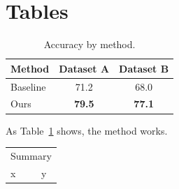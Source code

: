 
\section{Tables}
\begin{table}[ht]
  \centering
  \caption{Accuracy by method.}
  \label{tab:acc}
  \begin{tabular}{lcc}
    \hline
    Method & Dataset A & Dataset B \\
    \hline
    Baseline & 71.2 & 68.0 \\
    Ours & \textbf{79.5} & \textbf{77.1} \\
    \hline
  \end{tabular}
\end{table}

As Table~\ref{tab:acc} shows, the method works.

\begin{tabular}{|l|c|}
  \hline
  \multicolumn{2}{|c|}{Summary} \\
  x & y \\
\end{tabular}


